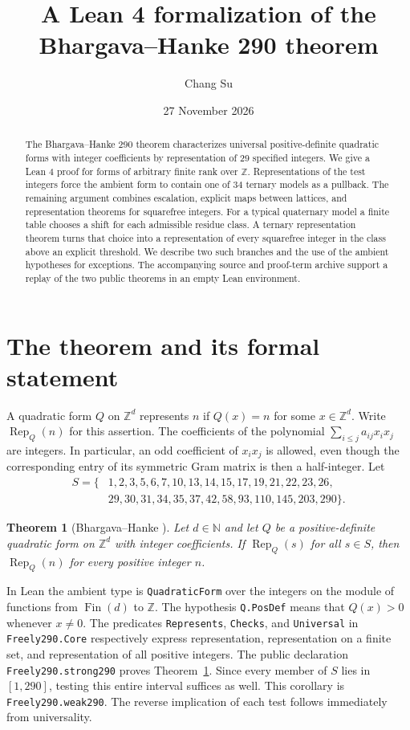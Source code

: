 \documentclass[11pt,a4paper]{article}
\title{A Lean 4 formalization of the\\ Bhargava--Hanke 290 theorem}
\author{Chang Su}
\date{27 November 2026}
\newtheorem{theorem}{Theorem}
\newcommand{\ZZ}{\mathbb Z}
\newcommand{\NN}{\mathbb N}
\newcommand{\rep}{\operatorname{Rep}}
\newcommand{\code}[1]{\texttt{#1}}
\begin{document}
\maketitle
\begin{abstract}
The Bhargava--Hanke 290 theorem characterizes universal positive-definite
quadratic forms with integer coefficients by representation of 29 specified
integers. We give a Lean 4 proof for forms of arbitrary finite rank over
$\ZZ$. Representations of the test integers force the ambient form to
contain one of 34 ternary models as a pullback. The remaining argument
combines escalation, explicit maps between lattices, and representation
theorems for squarefree integers. For a typical quaternary model a finite
table chooses a shift for each admissible residue class. A ternary
representation theorem turns that choice into a representation of every
squarefree integer in the class above an explicit threshold. We describe
two such branches and the use of the ambient hypotheses for exceptions.
The accompanying source and proof-term archive support a replay of the two
public theorems in an empty Lean environment.
\end{abstract}

\section{The theorem and its formal statement}
A quadratic form $Q$ on $\ZZ^d$ represents $n$ if $Q(x)=n$ for some
$x\in\ZZ^d$. Write $\rep_Q(n)$ for this assertion. The coefficients of
the polynomial $\sum_{i\leq j}a_{ij}x_ix_j$ are integers. In particular,
an odd coefficient of $x_ix_j$ is allowed, even though the corresponding
entry of its symmetric Gram matrix is then a half-integer.
Let
\[
\begin{split}
S=\{&1,2,3,5,6,7,10,13,14,15,17,19,21,22,23,26,\\
    &29,30,31,34,35,37,42,58,93,110,145,203,290\}.
\end{split}
\]
\begin{theorem}[Bhargava--Hanke {\cite[Theorem~1]{BH}}]\label{thm:main}
Let $d\in\NN$ and let $Q$ be a positive-definite quadratic form on
$\ZZ^d$ with integer coefficients. If $\rep_Q(s)$ for all $s\in S$, then
$\rep_Q(n)$ for every positive integer $n$.
\end{theorem}
In Lean the ambient type is \code{QuadraticForm} over the integers on
the module of functions from $\operatorname{Fin}(d)$ to $\ZZ$. The
hypothesis \code{Q.PosDef} means that $Q(x)>0$ whenever $x\ne 0$.
The predicates \code{Represents}, \code{Checks}, and \code{Universal}
in \code{Freely290.Core} respectively express representation, representation
on a finite set, and representation of all positive integers. The public
declaration \code{Freely290.strong290} proves Theorem~\ref{thm:main}.
Since every member of $S$ lies in $[1,290]$, testing this entire interval
suffices as well. This corollary is \code{Freely290.weak290}. The reverse
implication of each test follows immediately from universality.
\end{document}
